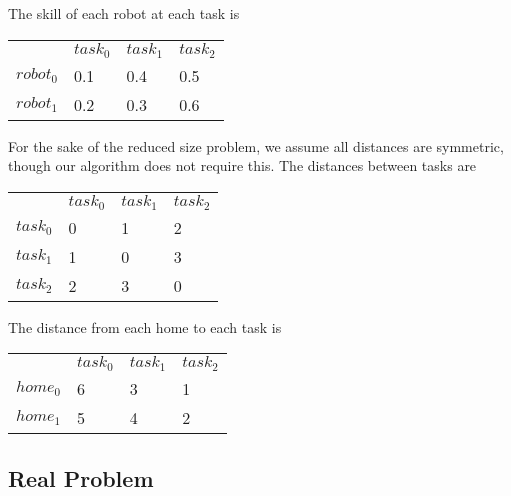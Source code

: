 \documentclass[a4paper]{article}
\begin{document}
The skill of each robot  at each task is

\begin{tabular}{llll}
                   & $\mathit{task}_0$ & $\mathit{task}_1$ & $\mathit{task}_2$ \\
$\mathit{robot}_0$ & 0.1               & 0.4               & 0.5               \\
$\mathit{robot}_1$ & 0.2               & 0.3               & 0.6               \\
\end{tabular}
\vspace{1.5em}

For the sake of the reduced size problem, we assume all distances are symmetric, though our algorithm does not require this. The distances between tasks are

\begin{tabular}{llll}
                   & $\mathit{task}_0$ & $\mathit{task}_1$ & $\mathit{task}_2$ \\
$\mathit{task}_0$  & 0                 & 1                 & 2                 \\
$\mathit{task}_1$  & 1                 & 0                 & 3                 \\
$\mathit{task}_2$  & 2                 & 3                 & 0                 \\
\end{tabular}
\vspace{1.5em}

The distance from each home to each task is

\begin{tabular}{llll}
                   & $\mathit{task}_0$ & $\mathit{task}_1$ & $\mathit{task}_2$ \\
$\mathit{home}_0$ & 6                 & 3                 & 1                  \\
$\mathit{home}_1$ & 5                 & 4                 & 2                  \\
\end{tabular}
\vspace{1.5em}

\subsection{Real Problem}

\end{document}

